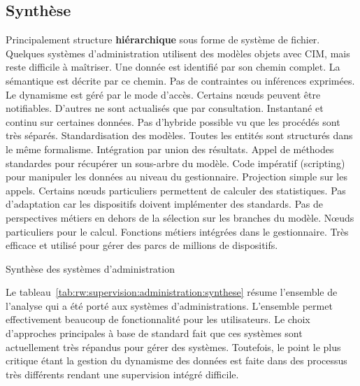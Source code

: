 \subsection{Synthèse}
\begin{table}[ht]
\criteretabDonnee
    {Principalement structure \textbf{hiérarchique} sous forme de système de fichier. Quelques systèmes d'administration utilisent des modèles objets avec CIM, mais reste difficile à maîtriser.}
    {Une donnée est identifié par son chemin complet. La sémantique est décrite par ce chemin. Pas de contraintes ou inférences exprimées.}
    {Le dynamisme est géré par le mode d'accès. Certains nœuds peuvent être notifiables. D'autres ne sont actualisés que par consultation.}
\criteretabTraitement
    {Instantané et continu sur certaines données. Pas d'hybride possible vu que les procédés sont très séparés.}
    {Standardisation des modèles. Toutes les entités sont structurés dans le même formalisme. Intégration par union des résultats.}
    {Appel de méthodes standardes pour récupérer un sous-arbre du modèle. Code impératif (scripting) pour manipuler les données au niveau du gestionnaire.}
    {Projection simple sur les appels. Certains nœuds particuliers permettent de calculer des statistiques.}
\criteretabAdaptabilite
    {Pas d'adaptation car les dispositifs doivent implémenter des standards.}
    {Pas de perspectives métiers en dehors de la sélection sur les branches du modèle.}
    {Nœuds particuliers pour le calcul. Fonctions métiers intégrées dans le gestionnaire.}
    {Très efficace et utilisé pour gérer des parcs de millions de dispositifs.}
\caption{Synthèse des systèmes d'administration}\label{tab:rw:supervision:administration:synthese}
\end{table}
Le tableau~\ref{tab:rw:supervision:administration:synthese} résume l'ensemble de l'analyse qui a été porté aux systèmes d'administrations. L'ensemble permet effectivement beaucoup de fonctionnalité pour les utilisateurs. Le choix d'approches principales à base de standard fait que ces systèmes sont actuellement très répandus pour gérer des systèmes. Toutefois, le point le plus critique étant la gestion du dynamisme des données est faite dans des processus très différents rendant une supervision intégré difficile.